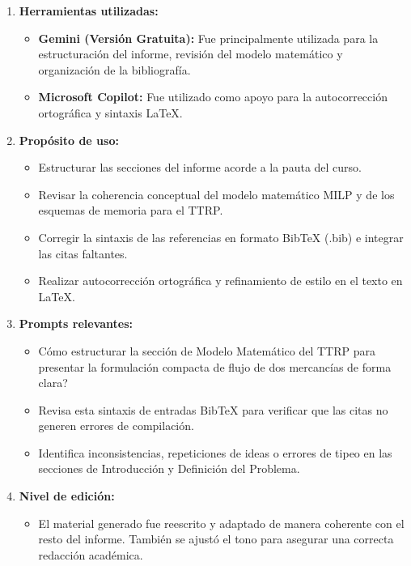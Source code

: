 \documentclass[letter, 10pt]{article}
\begin{document}
\begin{enumerate}
    \item \textbf{Herramientas utilizadas:} 
    \begin{itemize}
        \item \textbf{Gemini (Versi\'on Gratuita):} Fue principalmente utilizada para la estructuraci\'on del informe, revisi\'on del modelo matem\'atico y organizaci\'on de la bibliograf\'ia.
        \item \textbf{Microsoft Copilot:} Fue utilizado como apoyo para la autocorrecci\'on ortogr\'afica y sintaxis LaTeX.
    \end{itemize}

    \item \textbf{Prop\'osito de uso:} 
    \begin{itemize}
        \item Estructurar las secciones del informe acorde a la pauta del curso.
        \item Revisar la coherencia conceptual del modelo matem\'atico MILP y de los esquemas de memoria para el TTRP.
        \item Corregir la sintaxis de las referencias en formato BibTeX (.bib) e integrar las citas faltantes.
        \item Realizar autocorrecci\'on ortogr\'afica y refinamiento de estilo en el texto en LaTeX.
    \end{itemize}

    \item \textbf{Prompts relevantes:} 
    \begin{itemize}
        \item \textquestiondown{}C\'omo estructurar la secci\'on de Modelo Matem\'atico del TTRP para presentar la formulaci\'on compacta de flujo de dos mercanc\'ias de forma clara?
        \item Revisa esta sintaxis de entradas BibTeX para verificar que las citas no generen errores de compilaci\'on.
        \item Identifica inconsistencias, repeticiones de ideas o errores de tipeo en las secciones de Introducci\'on y Definici\'on del Problema.
    \end{itemize}

    \item \textbf{Nivel de edici\'on:} 
    \begin{itemize}
        \item El material generado fue reescrito y adaptado de manera coherente con el resto del informe. Tambi\'en se ajust\'o el tono para asegurar una correcta redacci\'on acad\'emica.
    \end{itemize}


\end{enumerate}
\end{document}
